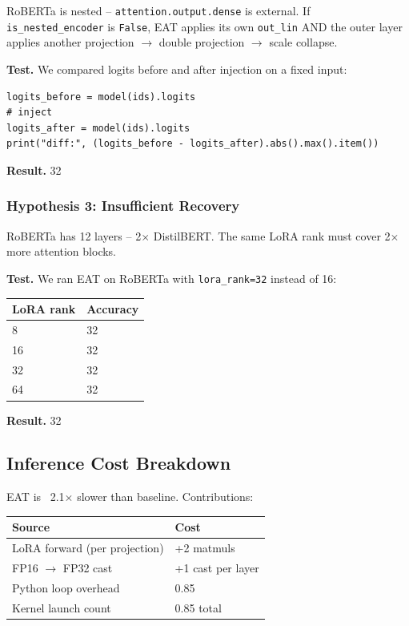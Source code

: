 RoBERTa is nested -- \texttt{attention.output.dense} is external. If 
\texttt{is\_nested\_encoder} is \texttt{False}, EAT applies its own \texttt{out\_lin} AND the 
outer layer applies another projection $\to$ double projection $\to$ scale collapse.

\textbf{Test.} We compared logits before and after injection on a fixed input:

\begin{lstlisting}
logits_before = model(ids).logits
# inject
logits_after = model(ids).logits
print("diff:", (logits_before - logits_after).abs().max().item())
\end{lstlisting}

\textbf{Result.} 32

\subsubsection{Hypothesis 3: Insufficient Recovery}

RoBERTa has 12 layers -- 2$\times$ DistilBERT. The same LoRA rank must cover 
2$\times$ more attention blocks.

\textbf{Test.} We ran EAT on RoBERTa with \texttt{lora\_rank=32} instead of 16:

\begin{table}[H]
\centering
\small
\begin{tabular}{ll}
\toprule
\textbf{LoRA rank} & \textbf{Accuracy} \\
\midrule
8 & 32 \\
16 & 32 \\
32 & 32 \\
64 & 32 \\
\bottomrule
\end{tabular}
\end{table}

\textbf{Result.} 32

\subsection{Inference Cost Breakdown}

EAT is ~2.1$\times$ slower than baseline. Contributions:

\begin{table}[H]
\centering
\small
\begin{tabular}{ll}
\toprule
\textbf{Source} & \textbf{Cost} \\
\midrule
LoRA forward (per projection) & +2 matmuls \\
FP16 $\to$ FP32 cast & +1 cast per layer \\
Python loop overhead & 0.85 \\
Kernel launch count & 0.85 total \\
\bottomrule
\end{tabular}
\end{table}

